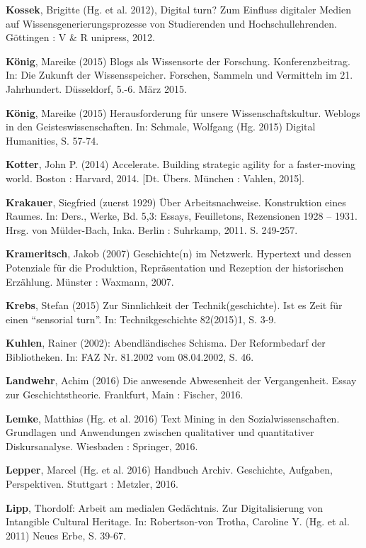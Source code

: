 \documentclass[a4paper,
fontsize=11pt,
oneside,
numbers=noperiodatend,
parskip=half-,
bibliography=totoc,
final
]{scrartcl}
\begin{document}
\textbf{Kossek}, Brigitte (Hg. et al. 2012), Digital turn? Zum Einfluss
digitaler Medien auf Wissensgenerierungsprozesse von Studierenden und
Hochschullehrenden. Göttingen : V \& R unipress, 2012.

\textbf{König}, Mareike (2015) Blogs als Wissensorte der Forschung.
Konferenzbeitrag. In: Die Zukunft der Wissensspeicher. Forschen, Sammeln
und Vermitteln im 21. Jahrhundert. Düsseldorf, 5.-6. März 2015.

\textbf{König}, Mareike (2015) Herausforderung für unsere
Wissenschaftskultur. Weblogs in den Geisteswissenschaften. In: Schmale,
Wolfgang (Hg. 2015) Digital Humanities, S. 57-74.

\textbf{Kotter}, John P. (2014) Accelerate. Building strategic agility
for a faster-moving world. Boston : Harvard, 2014. {[}Dt. Übers. München
: Vahlen, 2015{]}.

\textbf{Krakauer}, Siegfried (zuerst 1929) Über Arbeitsnachweise.
Konstruktion eines Raumes. In: Ders., Werke, Bd. 5,3: Essays,
Feuilletons, Rezensionen 1928 -- 1931. Hrsg. von Mülder-Bach, Inka.
Berlin : Suhrkamp, 2011. S. 249-257.

\textbf{Krameritsch}, Jakob (2007) Geschichte(n) im Netzwerk. Hypertext
und dessen Potenziale für die Produktion, Repräsentation und Rezeption
der historischen Erzählung. Münster : Waxmann, 2007.

\textbf{Krebs}, Stefan (2015) Zur Sinnlichkeit der Technik(geschichte).
Ist es Zeit für einen \enquote{sensorial turn}. In: Technikgeschichte
82(2015)1, S. 3-9.

\textbf{Kuhlen}, Rainer (2002): Abendländisches Schisma. Der
Reformbedarf der Bibliotheken. In: FAZ Nr. 81.2002 vom 08.04.2002, S.
46.

\textbf{Landwehr}, Achim (2016) Die anwesende Abwesenheit der
Vergangenheit. Essay zur Geschichtstheorie. Frankfurt, Main : Fischer,
2016.

\textbf{Lemke}, Matthias (Hg. et al. 2016) Text Mining in den
Sozialwissenschaften. Grundlagen und Anwendungen zwischen qualitativer
und quantitativer Diskursanalyse. Wiesbaden : Springer, 2016.

\textbf{Lepper}, Marcel (Hg. et al. 2016) Handbuch Archiv. Geschichte,
Aufgaben, Perspektiven. Stuttgart : Metzler, 2016.

\textbf{Lipp}, Thordolf: Arbeit am medialen Gedächtnis. Zur
Digitalisierung von Intangible Cultural Heritage. In: Robertson-von
Trotha, Caroline Y. (Hg. et al. 2011) Neues Erbe, S. 39-67.
\end{document}
